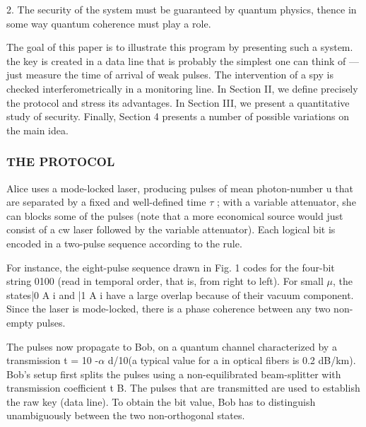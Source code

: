 2. The security of the system must be guaranteed by quantum physics, thence in some way quantum coherence must play a role.

The goal of this paper is to illustrate this program by presenting such a system. the key is created in a data line that is probably the simplest one can think of —just measure the time of arrival of weak pulses. The intervention of a spy is checked interferometrically in a monitoring line. In Section II, we define precisely the protocol and stress its advantages. In Section III, we present a quantitative study of security. Finally, Section 4 presents a number of possible variations on the main idea.


\subsubsection{THE PROTOCOL}

Alice uses a mode-locked laser, producing pulses of mean photon-number u that are separated by a fixed and well-defined time $\tau$ ; with a variable attenuator, she can blocks some of the pulses (note that a more economical source would just consist of a cw laser followed by the variable attenuator). Each logical bit is encoded in a two-pulse sequence according to the rule.

For instance, the eight-pulse sequence drawn in Fig. 1 codes for the four-bit string 0100 (read in temporal order, that is, from right to left). For small $\mu$, the states|0 A i and |1 A i have a large overlap because of their vacuum component. Since the laser is mode-locked, there is a phase coherence between any two non-empty pulses.

The pulses now propagate to Bob, on a quantum channel characterized by a transmission t = 10 -$\alpha$ d/10(a typical value for a in optical fibers is 0.2 dB/km).
Bob’s setup first splits the pulses using a non-equilibrated beam-splitter with transmission coefficient t B. The pulses that are transmitted are used to establish the raw key (data line). To obtain the bit value, Bob has to distinguish unambiguously between the two non-orthogonal states.

